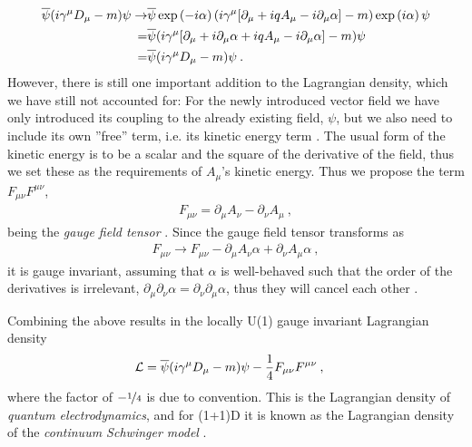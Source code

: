 \documentclass[../main.tex]{subfiles} %
\begin{document}
\begin{align}
\begin{split}
    \psibar (i \gamma^\mu D_\mu - m) \psi \rightarrow
        & \psibar \exp{-i\alpha} (i \gamma^\mu [\partial_\mu + iqA_\mu - i\partial_\mu\alpha] - m) \exp{i\alpha} \psi \\
        =& \psibar (i \gamma^\mu [\partial_\mu + i \partial_\mu \alpha + iqA_\mu - i\partial_\mu\alpha] - m) \psi \\
        =& \psibar (i \gamma^\mu D_\mu - m) \psi \: .
\end{split}
\end{align}
However, there is still one important addition to the Lagrangian density, which we have still not accounted for: For the newly introduced vector field we have only introduced its coupling to the already existing field, $\psi$, but we also need to include its own ''free'' term, i.e. its kinetic energy term \cite{griffiths_introToElementaryParticles_2008}. The usual form of the kinetic energy is to be a scalar and the square of the derivative of the field, thus we set these as the requirements of $A_\mu$'s kinetic energy. Thus we propose the term $F_{\mu\nu}F^{\mu\nu}$,
\begin{align}
    F_{\mu\nu} = \partial_\mu A_\nu - \partial_\nu A_\mu \: ,
\end{align}
being the \emph{gauge field tensor} \cite{griffiths_introToEldyn_2017}. Since the gauge field tensor transforms as
\begin{align}
    F_{\mu\nu} \rightarrow F_{\mu\nu} - \partial_\mu A_\nu \alpha + \partial_\nu A_\mu \alpha \: ,
\end{align}
it is gauge invariant, assuming that $\alpha$ is well-behaved such that the order of the derivatives is irrelevant, $\partial_\mu\partial_\nu\alpha = \partial_\nu\partial_\mu\alpha$, thus they will cancel each other \cite{panyella_masterThesis_2019}.

Combining the above results in the locally U(1) gauge invariant Lagrangian density
\begin{align} \label{eq:ContinuumSchwingerModelLagrangianDensity}
    \mathcal{L} &= \overline{\psi} (i \gamma^\mu D_\mu - m) \psi - \frac{1}{4}F_{\mu\nu}F^{\mu\nu} \: ,
\end{align}
where the factor of $-\nicefrac{1}{4}$ is due to convention. This is the Lagrangian density of \emph{quantum electrodynamics}, and for (1+1)D it is known as the Lagrangian density of the \emph{continuum Schwinger model} \cite{melnikov_latticeSchwingerModel_2000}.
\end{document}
